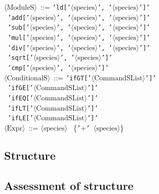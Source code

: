 \begin{tabbing}
    $\langle \text{ModuleS} \rangle$ \,::=\;  \texttt{'ld['$\langle \text{species} \rangle$', '$\langle \text{species} \rangle$']'} \\
    
     \>\textbar \, \texttt{'add['$\langle \text{species} \rangle$', '$\langle \text{species} \rangle$', '$\langle \text{species} \rangle$']'} \\
     
     \>\textbar \, \texttt{'sub['$\langle \text{species} \rangle$', '$\langle \text{species} \rangle$', '$\langle \text{species} \rangle$']'} \\
     
     \>\textbar \, \texttt{'mul['$\langle \text{species} \rangle$', '$\langle \text{species} \rangle$', '$\langle \text{species} \rangle$']'} \\
     
     \>\textbar \, \texttt{'div['$\langle \text{species} \rangle$', '$\langle \text{species} \rangle$', '$\langle \text{species} \rangle$']'} \\
     
     \>\textbar \, \texttt{'sqrt['$\langle \text{species} \rangle$', '$\langle \text{species} \rangle$']'} \\
     
     \>\textbar \, \texttt{'cmp['$\langle \text{species} \rangle$', '$\langle \text{species} \rangle$']'} \\
     
    $\langle \text{ConditionalS} \rangle$ \,::=\;  \texttt{'ifGT['$\langle \text{CommandSList} \rangle$']'} \\
    
     \>\textbar \, \texttt{'ifGE['$\langle \text{CommandSList} \rangle$']'} \\
     
     \>\textbar \, \texttt{'ifEQ['$\langle \text{CommandSList} \rangle$']'} \\
     
     \>\textbar \, \texttt{'ifLT['$\langle \text{CommandSList} \rangle$']'} \\
     
     \>\textbar \, \texttt{'ifLE['$\langle \text{CommandSList} \rangle$']'} \\
     
    $\langle \text{Expr} \rangle$ \,::=\;  \texttt{$\langle \text{species} \rangle$} 
    \, \{\texttt{'$+$' $\langle \text{species} \rangle$}\}
\end{tabbing}

\subsection{Structure}

\subsection{Assessment of structure}





